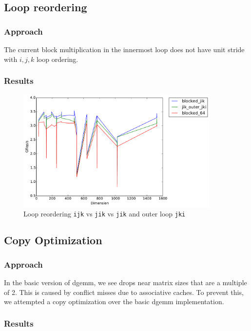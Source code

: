 \documentclass[11pt]{article}
\theoremstyle{plain}
\theoremstyle{definition}
\begin{document}
\subsection{Loop reordering}
\subsubsection{Approach}
The current block multiplication in the innermost loop does not have unit stride with $i, j, k$ loop ordering. 
\subsubsection{Results}

\begin{figure}[H]
    \includegraphics[width=0.9\textwidth]{timing_loop_reorder_fast.pdf}
    \caption{Loop reordering \texttt{ijk} vs \texttt{jik} vs \texttt{jik} and outer loop \texttt{jki}}
    \label{basic_copy_opt}
\end{figure} 

\subsection{Copy Optimization}
\subsubsection{Approach}
In the basic version of dgemm, we see drops near matrix sizes that are a multiple of 2. This is caused by conflict misses due to associative caches. To prevent this, we attempted a copy optimization over the basic dgemm implementation.
\subsubsection{Results}
\end{document}

